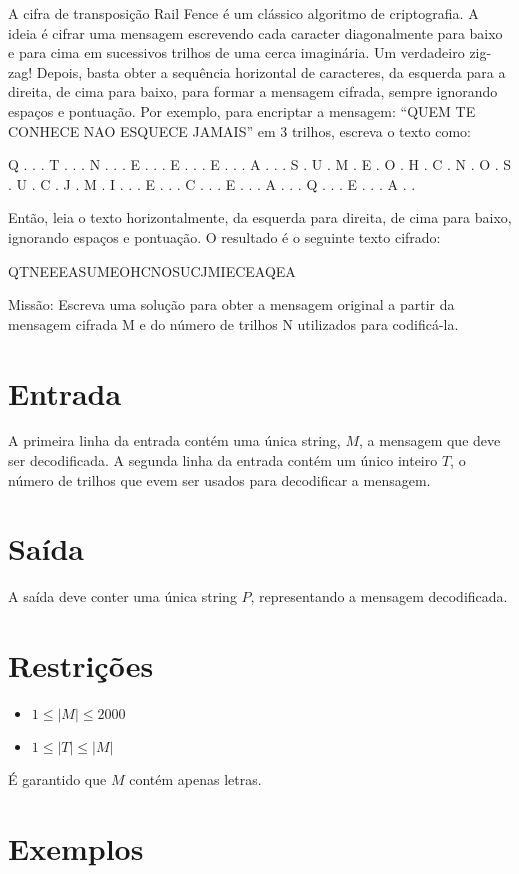 A cifra de transposição Rail Fence é um clássico algoritmo de criptografia. A ideia é cifrar uma mensagem escrevendo cada caracter diagonalmente para baixo e para cima em sucessivos trilhos de uma cerca imaginária. Um verdadeiro zig-zag! Depois, basta obter a sequência horizontal de caracteres, da esquerda para a direita, de cima para baixo, para formar a mensagem cifrada, sempre ignorando espaços e pontuação.
Por exemplo, para encriptar a mensagem: “QUEM TE CONHECE NAO ESQUECE JAMAIS” em 3 trilhos, escreva o texto como:

Q . . . T . . . N . . . E . . . E . . . E . . . A . . . S 
. U . M . E . O . H . C . N . O . S . U . C . J . M . I . 
. . E . . . C . . . E . . . A . . . Q . . . E . . . A . . 


Então, leia o texto horizontalmente, da esquerda para direita, de cima para baixo, ignorando espaços e pontuação. O resultado é o seguinte texto cifrado:

QTNEEEASUMEOHCNOSUCJMIECEAQEA

Missão:
Escreva uma solução para obter a mensagem original a partir da mensagem cifrada M e do número de trilhos N utilizados para codificá-la.

\section*{Entrada}

A primeira linha da entrada contém uma única string, $M$, a mensagem que deve ser decodificada. A segunda linha da entrada contém um único inteiro $T$, o número de trilhos que evem ser usados para decodificar a mensagem.

\section*{Saída}

A saída deve conter uma única string $P$, representando a mensagem decodificada.

\section*{Restrições}

\begin{itemize}
\item $1 \leq |M| \leq 2000$
\item $1 \leq |T| \leq |M|$
\end{itemize}

É garantido que $M$ contém apenas letras.

\section*{Exemplos}

\exemplo
